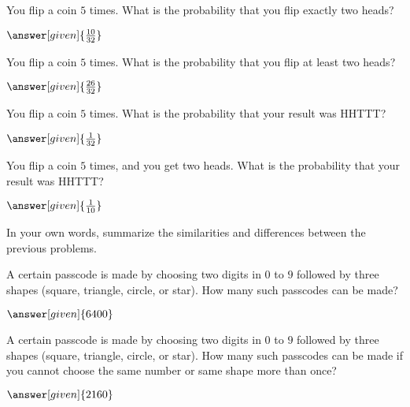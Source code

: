 \documentclass[nooutcomes]{ximera}
\begin{document}
\begin{problem}
	You flip a coin $5$ times.  What is the probability that you flip exactly two heads?
	\begin{prompt}
		$\answer[given]{\frac{10}{32}}$
	\end{prompt}
\end{problem}


\begin{problem}
	You flip a coin $5$ times.  What is the probability that you flip at least two heads?
	\begin{prompt}
		$\answer[given]{\frac{26}{32}}$
	\end{prompt}
\end{problem}


\begin{problem}
	You flip a coin $5$ times.  What is the probability that your result was HHTTT?
	\begin{prompt}
		$\answer[given]{\frac{1}{32}}$
	\end{prompt}
\end{problem}


\begin{problem}
	You flip a coin $5$ times, and you get two heads.  What is the probability that your result was HHTTT?
	\begin{prompt}
		$\answer[given]{\frac{1}{10}}$
	\end{prompt}
\end{problem}

\begin{problem}
In your own words, summarize the similarities and differences between the previous problems.

\begin{freeResponse}
\end{freeResponse}
\end{problem}


\begin{problem}
A certain passcode is made by choosing two digits in $0$ to $9$ followed by three shapes (square, triangle, circle, or star).  How many such passcodes can be made?
\begin{prompt}
	$\answer[given]{6400}$ %
\end{prompt}
\end{problem}



\begin{problem}
A certain passcode is made by choosing two digits in $0$ to $9$ followed by three shapes (square, triangle, circle, or star).  How many such passcodes can be made if you cannot choose the same number or same shape more than once?
\begin{prompt}
	$\answer[given]{2160}$ %
\end{prompt}
\end{problem}
\end{document}
